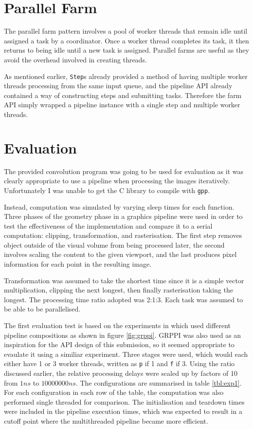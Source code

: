 \documentclass[12pt]{article}
\def\code#1{\texttt{#1}}
\begin{document}
\section{Parallel Farm}

The parallel farm pattern involves a pool of worker threads that remain idle until assigned a task by a coordinator. Once a worker thread completes its task, it then returns to being idle until a new task is assigned. Parallel farms are useful as they avoid the overhead involved in creating threads. 

As mentioned earlier, \code{Step}s already provided a method of having multiple worker threads processing from the same input queue, and the pipeline API already contained a way of constructing steps and submitting tasks. Therefore the farm API simply wrapped a pipeline instance with a single step and multiple worker threads.

\section{Evaluation}

The provided convolution program was going to be used for evaluation as it was clearly appropriate to use a pipeline when processing the images iteratively. Unfortunately I was unable to get the C library to compile with \code{gpp}.

Instead, computation was simulated by varying sleep times for each function. Three phases of the geometry phase in a graphics pipeline were used in order to test the effectiveness of the implementation and compare it to a serial computation: clipping, transformation, and rasterisation. The first step removes object outside of the visual volume from being processed later, the second involves scaling the content to the given viewport, and the last produces pixel information for each point in the resulting image. 

Transformation was assumed to take the shortest time since it is a simple vector multiplication, clipping the next longest, then finally rasterisation taking the longest. The processing time ratio adopted was 2:1:3. Each task was assumed to be able to be parallelised. 

The first evaluation test is based on the experiments in \cite{grppi} which used different pipeline compositions as shown in figure \ref{fig:grppi}. GRPPI was also used as an inspiration for the API design of this submission, so it seemed appropriate to evaulate it using a similiar experiment. Three stages were used, which would each either have 1 or 3 worker threads, written as \code{p} if 1 and \code{f} if 3. Using the ratio discussed earlier, the relative processing delays were scaled up by factors of 10 from $1ns$ to $10000000ns$. The configurations are summarised in table \ref{tbl:exp1}. For each configuration in each row of the table, the computation was also performed single threaded for comparison. The initialisation and teardown times were included in the pipeline execution times, which was expected to result in a cutoff point where the multithreaded pipeline became more efficient.
\end{document}
